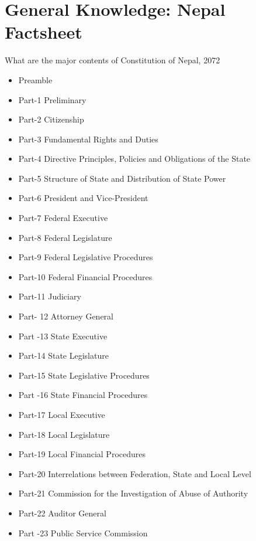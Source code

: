 \section*{General Knowledge: Nepal Factsheet}

\begin{questions}


\question What are the major contents of Constitution of Nepal, 2072
  \begin{solution}
  \begin{itemize}
  \item Preamble
  \item Part-1 Preliminary
  \item Part-2 Citizenship
  \item Part-3 Fundamental Rights and Duties
  \item Part-4 Directive Principles, Policies and Obligations of the State
  \item Part-5 Structure of State and Distribution of State Power
  \item Part-6 President and Vice-President
  \item Part-7 Federal Executive
  \item Part-8 Federal Legislature
  \item Part-9 Federal Legislative Procedures
  \item Part-10 Federal Financial Procedures
  \item Part-11 Judiciary
  \item Part- 12 Attorney General
  \item Part -13 State Executive
  \item Part-14 State Legislature
  \item Part-15 State Legislative Procedures
  \item Part -16 State Financial Procedures
  \item Part-17 Local Executive
  \item Part-18 Local Legislature
  \item Part-19 Local Financial Procedures
  \item Part-20 Interrelations between Federation, State and Local Level
  \item Part-21 Commission for the Investigation of Abuse of Authority
  \item Part-22 Auditor General
  \item Part -23 Public Service Commission

\end{itemize}
\end{solution}
\end{questions}
